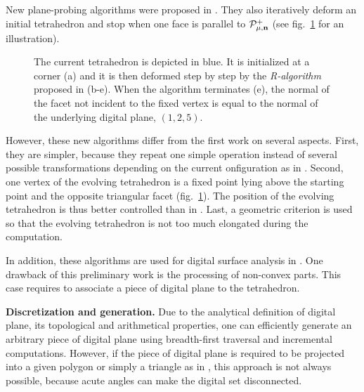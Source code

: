New plane-probing algorithms were proposed in \cite{LPRDGCI2016, LPRJMIV2017}. 
They also iteratively deform an initial tetrahedron and stop when one face is
parallel to $\mathcal{P}^{+}_{\mu,\mathbf{n}}$ (see fig.~\ref{fig:ppa} for an illustration). 
%
\begin{figure}[htbp]
  \centering
  \caption{The current tetrahedron is depicted in blue. It is initialized at a corner (a) 
    and it is then deformed step by step by the \emph{R-algorithm} proposed in \cite{LPRJMIV2017} (b-e).
    When the algorithm terminates (e), the normal of the facet not incident to the fixed vertex
    is equal to the normal of the underlying digital plane, \ie $(1,2,5)$.}
    \label{fig:ppa}
\end{figure}
%
However, these new algorithms differ from the first work on several aspects.
First, they are simpler, because they repeat one simple operation instead
of several possible transformations depending on the current onfiguration
as in \cite{LPRTCS2016}.  
Second, one vertex of the evolving tetrahedron is a fixed point lying above the 
starting point and the opposite triangular facet (fig.~\ref{fig:ppa}). The position
of the evolving tetrahedron is thus better controlled than in \cite{LPRTCS2016}. 
Last, a geometric criterion is used so that the evolving tetrahedron is not
too much elongated during the computation.  

In addition, these algorithms are used for digital surface analysis in \cite{LPRJMIV2017}.
One drawback of this preliminary work is the processing of non-convex parts.
This case requires to associate a piece of digital plane to the tetrahedron.

\noindent\textbf{Discretization and generation.}
Due to the analytical definition of digital plane, its topological and
arithmetical properties, one can efficiently generate an arbitrary piece
of digital plane using breadth-first traversal and incremental computations.
However, if the piece of digital plane is required to be projected into a
given polygon or simply a triangle as in \cite{LPRJMIV2017}, this approach
is not always possible, because acute angles can make the digital set disconnected. 

